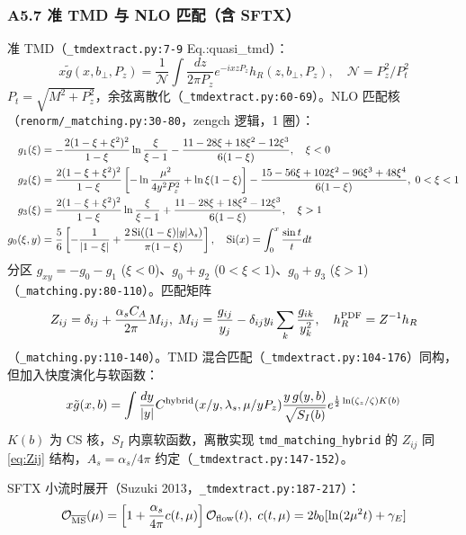 \documentclass[UTF8]{ctexart}
\begin{document}
\subsubsection{A5.7 准 TMD 与 NLO 匹配（含 SFTX）}
准 TMD（\texttt{\nolinkurl{\_tmdextract.py:7-9}} Eq.:quasi\_tmd）：
\begin{equation}
x\tilde g(x,b_\perp,P_z)=\frac1{\mathcal{N}}\int\frac{dz}{2\pi P_z}e^{-ixzP_z}h_R(z,b_\perp,P_z),\quad \mathcal{N}=P_z^2/P_t^2
\label{eq:quasiTMD}
\end{equation}
$P_t=\sqrt{M^2+P_z^2}$，余弦离散化（\texttt{\nolinkurl{\_tmdextract.py:60-69}}）。NLO 匹配核（\texttt{\nolinkurl{renorm/\_matching.py:30-80}}，zengch 逻辑，1 圈）：
\begin{align}
g_1(\xi)&=-\frac{2(1-\xi+\xi^2)^2}{1-\xi}\ln\frac{\xi}{\xi-1}-\frac{11-28\xi+18\xi^2-12\xi^3}{6(1-\xi)},\quad \xi<0 \nonumber\\
g_2(\xi)&=\frac{2(1-\xi+\xi^2)^2}{1-\xi}\left[-\ln\frac{\mu^2}{4y^2P_z^2}+\ln\xi(1-\xi)\right]-\frac{15-56\xi+102\xi^2-96\xi^3+48\xi^4}{6(1-\xi)},\;0<\xi<1 \nonumber\\
g_3(\xi)&=\frac{2(1-\xi+\xi^2)^2}{1-\xi}\ln\frac{\xi}{\xi-1}+\frac{11-28\xi+18\xi^2-12\xi^3}{6(1-\xi)},\quad \xi>1 \label{eq:g123}\\
g_0(\xi,y)&=\frac56\left[-\frac1{|1-\xi|}+\frac{2\,{\rm Si}((1-\xi)|y|\lambda_s)}{\pi(1-\xi)}\right],\quad {\rm Si}(x)=\int_0^x\frac{\sin t}{t}dt \nonumber
\end{align}
分区 $g_{xy}= -g_0-g_1$ ($\xi<0$)、$g_0+g_2$ ($0<\xi<1$)、$g_0+g_3$ ($\xi>1$)（\texttt{\nolinkurl{\_matching.py:80-110}}）。匹配矩阵
\begin{equation}
Z_{ij}=\delta_{ij}+\frac{\alpha_s C_A}{2\pi}M_{ij},\;M_{ij}=\frac{g_{ij}}{y_j}-\delta_{ij}y_i\sum_k\frac{g_{ik}}{y_k^2},\quad h_R^{\rm PDF}=Z^{-1}h_R
\label{eq:Zij}
\end{equation}
（\texttt{\nolinkurl{\_matching.py:110-140}}）。TMD 混合匹配（\texttt{\nolinkurl{\_tmdextract.py:104-176}}）同构，但加入快度演化与软函数：
\begin{equation}
x\tilde g(x,b)=\int\frac{dy}{|y|}C^{\rm hybrid}(x/y,\lambda_s,\mu/yP_z)\frac{y\,g(y,b)}{\sqrt{S_I(b)}}e^{\frac12\ln(\zeta_z/\zeta)K(b)}
\label{eq:TMDmatch}
\end{equation}
$K(b)$ 为 CS 核，$S_I$ 内禀软函数，离散实现 \texttt{\nolinkurl{tmd\_matching\_hybrid}} 的 $Z_{ij}$ 同 \eqref{eq:Zij} 结构，$A_s=\alpha_s/4\pi$ 约定（\texttt{\nolinkurl{\_tmdextract.py:147-152}}）。

SFTX 小流时展开（Suzuki 2013，\texttt{\nolinkurl{\_tmdextract.py:187-217}}）：
\begin{equation}
\mathcal{O}_{\overline{\rm MS}}(\mu)=\left[1+\frac{\alpha_s}{4\pi}c(t,\mu)\right]\mathcal{O}_{\rm flow}(t),\;c(t,\mu)=2b_0[\ln(2\mu^2t)+\gamma_E]
\label{eq:SFTX}
\end{equation}
\end{document}
